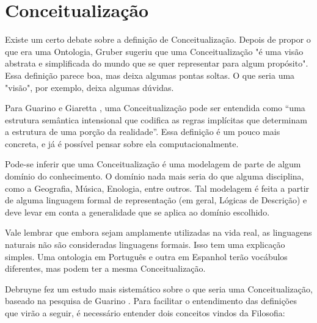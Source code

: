 \section{Conceitualização}
	
Existe um certo debate sobre a definição de Conceitualização. Depois de propor o que era uma Ontologia, Gruber sugeriu que uma Conceitualização "é uma visão abstrata e simplificada do mundo que se quer representar para algum propósito". Essa definição parece boa, mas deixa algumas pontas soltas. O que seria uma "visão", por exemplo, deixa algumas dúvidas.

Para Guarino e Giaretta \cite{ontoGiaretta}, uma Conceitualização pode ser entendida como “uma estrutura semântica intensional que codifica as regras implícitas que determinam a estrutura de uma porção da realidade”. Essa definição é um pouco mais concreta, e já é possível pensar sobre ela computacionalmente.

Pode-se inferir que uma Conceitualização é uma modelagem de parte de algum domínio do conhecimento. O domínio nada mais seria do que alguma disciplina, como a Geografia, Música, Enologia, entre outros. Tal modelagem é feita a partir de alguma linguagem formal de representação (em geral, Lógicas de Descrição) e deve levar em conta a generalidade que se aplica ao domínio escolhido.

Vale lembrar que embora sejam amplamente utilizadas na vida real, as linguagens naturais não são consideradas linguagens formais. Isso tem uma explicação simples. Uma ontologia em Português e outra em Espanhol terão vocábulos diferentes, mas podem ter a mesma Conceitualização.

Debruyne \cite{ontoDebruyne} fez um estudo mais sistemático sobre o que seria uma Conceitualização, baseado na pesquisa de Guarino \cite{ontoGuarino}. Para facilitar o entendimento das definições que virão a seguir, é necessário entender dois conceitos vindos da Filosofia:

